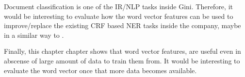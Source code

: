 Document classification is one of the \ac{IR}/\ac{NLP} tasks inside Gini.
Therefore, it would be interesting to evaluate how the word vector features
can be used to improve/replace the existing \ac{CRF} based \ac{NER} tasks
inside the company, maybe in a similar way to
\cite{Turian:2010:WRS:1858681.1858721}.

Finally, this chapter chapter shows that word vector features,  are useful even in abscense of
large amount of data to train them from. It would be interesting to evaluate
the word vector once that  more data becomes available.








 












